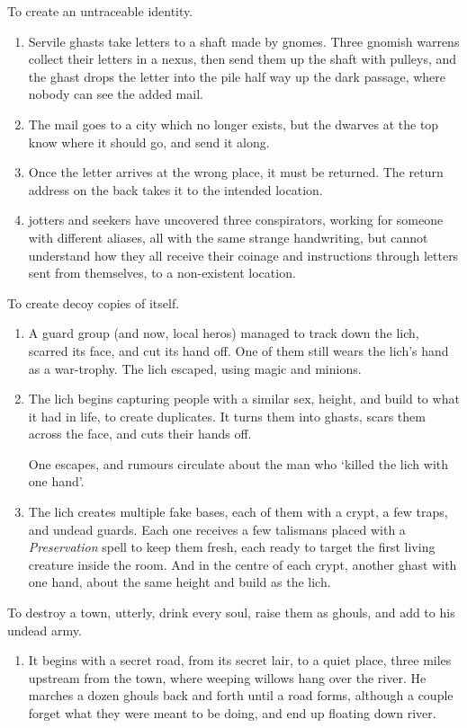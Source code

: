\begin{multicols}{2}
\begin{dlist}
  \item
  To create an untraceable identity.
  \begin{enumerate}
    \item
    Servile ghasts take letters to a shaft made by gnomes.
    Three gnomish warrens collect their letters in a nexus, then send them up the shaft with pulleys, and the ghast drops the letter into the pile half way up the dark passage, where nobody can see the added mail.
    \item
    The mail goes to a city which no longer exists, but the dwarves at the top know where it should go, and send it along.
    \item
    Once the letter arrives at the wrong place, it must be returned.
    The return address on the back takes it to the intended location.
    \item
    \Glspl{jotter} and \glspl{seeker} have uncovered three conspirators, working for someone with different aliases, all with the same strange handwriting, but cannot understand how they all receive their coinage and instructions through letters sent from themselves, to a non-existent location.
  \end{enumerate}
  \item
  To create decoy copies of itself.
  \begin{enumerate}
    \item
    A \gls{guard} group (and now, local heros) managed to track down the lich, scarred its face, and cut its hand off.
    One of them still wears the lich's hand as a war-trophy.
    The lich escaped, using magic and minions.
    \item
    The lich begins capturing people with a similar sex, height, and build to what it had in life, to create duplicates.
    It turns them into ghasts, scars them across the face, and cuts their hands off.

    One escapes, and rumours circulate about the man who `killed the lich with one hand'.
    \item
    The lich creates multiple fake bases, each of them with a crypt, a few traps, and undead guards.
    Each one receives a few \glspl{talisman} placed with a \textit{Preservation} spell to keep them fresh, each ready to target the first living creature inside the room.
    And in the centre of each crypt, another ghast with one hand, about the same height and build as the lich.
  \end{enumerate}
  \item
  To destroy a town, utterly, drink every soul, raise them as ghouls, and add to his undead army.
  \begin{enumerate}
    \item
    It begins with a secret road, from its secret lair, to a quiet place, three miles upstream from the town, where weeping willows hang over the river.
    He marches a dozen ghouls back and forth until a road forms, although a couple forget what they were meant to be doing, and end up floating down river.


\end{enumerate}
\end{dlist}
\end{multicols}

